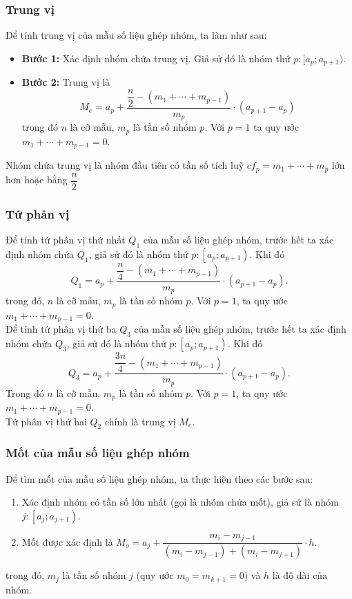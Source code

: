 \begin{tomtat}
	\subsubsection{Trung vị}
	Để tính trung vị của mẫu số liệu ghép nhóm, ta làm như sau:
\begin{itemize}
    \item \textbf{Bước 1:} Xác định nhóm chứa trung vị. Giả sử đó là nhóm thứ $p : [a_p; a_{p + 1})$.
    \item \textbf{Bước 2:} Trung vị là 
    $$M_e = a_p + \dfrac{\dfrac{n}{2} - (m_1 + \cdots + m_{p-1})}{m_p} \cdot ( a_{p + 1} - a_p)$$
    trong đó $n$ là cỡ mẫu, $m_p$ là tần số nhóm $p$. Với $p=1$ ta quy ước $m_1 + \cdots + m_{p-1} = 0$.
\end{itemize}
		\begin{note}
			Nhóm chứa trung vị là nhóm đầu tiên có tần số tích luỹ $cf_p=m_1 + \cdots + m_{p}$ lớn hơn hoặc bằng $\dfrac{n}{2}$
		\end{note}
	\subsubsection{Tứ phân vị}Để tính tứ phân vị thứ nhất $Q_1$ của mẫu số liệu ghép nhóm, trước hết ta xác định nhóm chứa $Q_1$, giả sử đó là nhóm thứ  $p:\left[a_p;a_{p+1} \right)$. Khi đó 
	$$Q_1=a_p+\dfrac{\dfrac{n}{4}-\left(m_1+\cdots+m_{p-1}\right)}{m_p}\cdot \left(a_{p+1}-a_p\right).$$
	trong đó, $n$ là cỡ mẫu, $m_p$ là tần số nhóm $p$. Với $p=1$, ta quy ước $m_1+\cdots+m_{p-1}=0$.\\
	Để tính tứ phân vị thứ ba $Q_3$ của mẫu số liệu ghép nhóm, trước hết ta xác định nhóm chứa $Q_3$, giả sử đó là nhóm thứ  $p:\left[a_p;a_{p+1} \right)$. Khi đó 
	$$Q_3=a_p+\dfrac{\dfrac{3n}{4}-\left(m_1+\cdots+m_{p-1}\right)}{m_p}\cdot \left(a_{p+1}-a_p\right).$$
	Trong đó $n$ là cỡ mẫu, $m_p$ là tần số nhóm $p$. Với $p=1$, ta quy ước $m_1+\cdots+m_{p-1}=0$.\\
	Tứ phân vị thứ hai $Q_2$ chính là trung vị $M_e$.\\
\subsubsection{Mốt của mẫu số liệu ghép nhóm}
Để tìm mốt của mẫu số liệu ghép nhóm, ta thực hiện theo các bước sau:
\begin{enumerate}
	\item [Bước 1.] Xác định nhóm có tần số lớn nhất (gọi là nhóm chứa mốt), giả sử là nhóm $j:\left[a_j;a_{j+1} \right)$.
	\item [Bước 2.] Mốt được xác định là $M_o=a_j+\dfrac{m_i-m_{j-1}}{\left(m_i-m_{j-1}\right)+\left(m_i-m_{j+1}\right)}\cdot h$.\\
\end{enumerate}
trong đó, $m_j$ là tần số nhóm $j$ (quy ước $m_0=m_{k+1}=0$) và $h$ là độ dài của nhóm.	

\end{tomtat}
\setcounter{subsubsection}{0}
\setcounter{ex}{0}
\setcounter{bt}{0}
